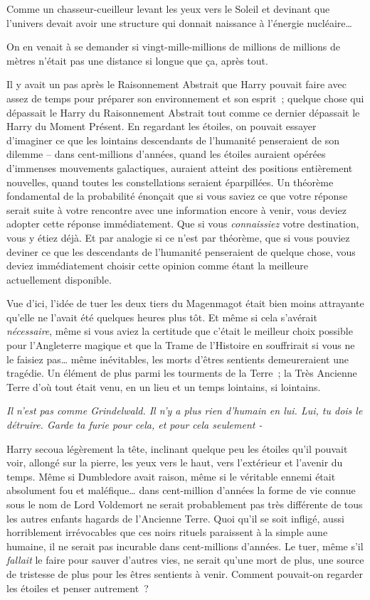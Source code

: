 Comme un chasseur-cueilleur levant les yeux vers le Soleil et devinant que l'univers devait avoir une structure qui donnait naissance à l'énergie nucléaire…

On en venait à se demander si vingt-mille-millions de millions de millions de mètres n'était pas une distance si longue que ça, après tout.

Il y avait un pas après le Raisonnement Abstrait que Harry pouvait faire avec assez de temps pour préparer son environnement et son esprit~; quelque chose qui dépassait le Harry du Raisonnement Abstrait tout comme ce dernier dépassait le Harry du Moment Présent. En regardant les étoiles, on pouvait essayer d'imaginer ce que les lointains descendants de l'humanité penseraient de son dilemme -- dans cent-millions d'années, quand les étoiles auraient opérées d'immenses mouvements galactiques, auraient atteint des positions entièrement nouvelles, quand toutes les constellations seraient éparpillées. Un théorème fondamental de la probabilité énonçait que si vous saviez ce que votre réponse serait suite à votre rencontre avec une information encore à venir, vous deviez adopter cette réponse immédiatement. Que si vous \emph{connaissiez} votre destination, vous y étiez déjà. Et par analogie si ce n'est par théorème, que si vous pouviez deviner ce que les descendants de l'humanité penseraient de quelque chose, vous deviez immédiatement choisir cette opinion comme étant la meilleure actuellement disponible.

Vue d'ici, l'idée de tuer les deux tiers du Magenmagot était bien moins attrayante qu'elle ne l'avait été quelques heures plus tôt. Et même si cela s'avérait \emph{nécessaire}, même si vous aviez la certitude que c'était le meilleur choix possible pour l'Angleterre magique et que la Trame de l'Histoire en souffrirait si vous ne le faisiez pas… même inévitables, les morts d'êtres sentients demeureraient une tragédie. Un élément de plus parmi les tourments de la Terre~; la Très Ancienne Terre d'où tout était venu, en un lieu et un temps lointains, si lointains.

\emph{Il n'est pas comme Grindelwald. Il n'y a plus rien d'humain en lui. Lui, tu dois le détruire. Garde ta furie pour cela, et pour cela seulement -}

Harry secoua légèrement la tête, inclinant quelque peu les étoiles qu'il pouvait voir, allongé sur la pierre, les yeux vers le haut, vers l'extérieur et l'avenir du temps. Même si Dumbledore avait raison, même si le véritable ennemi était absolument fou et maléfique… dans cent-million d'années la forme de vie connue sous le nom de Lord Voldemort ne serait probablement pas très différente de tous les autres enfants hagards de l'Ancienne Terre. Quoi qu'il se soit infligé, aussi horriblement irrévocables que ces noirs rituels paraissent à la simple aune humaine, il ne serait pas incurable dans cent-millions d'années. Le tuer, même s'il \emph{fallait} le faire pour sauver d'autres vies, ne serait qu'une mort de plus, une source de tristesse de plus pour les êtres sentients à venir. Comment pouvait-on regarder les étoiles et penser autrement~?


